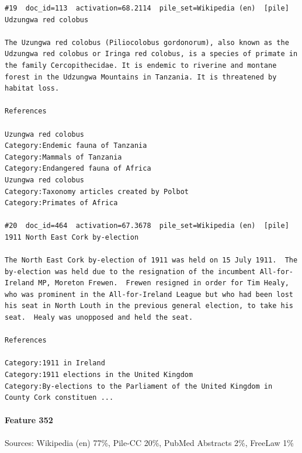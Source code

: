 \begin{verbatim}
#19  doc_id=113  activation=68.2114  pile_set=Wikipedia (en)  [pile]
Udzungwa red colobus

The Uzungwa red colobus (Piliocolobus gordonorum), also known as the Udzungwa red colobus or Iringa red colobus, is a species of primate in the family Cercopithecidae. It is endemic to riverine and montane forest in the Udzungwa Mountains in Tanzania. It is threatened by habitat loss.

References

Uzungwa red colobus
Category:Endemic fauna of Tanzania
Category:Mammals of Tanzania
Category:Endangered fauna of Africa
Uzungwa red colobus
Category:Taxonomy articles created by Polbot
Category:Primates of Africa

#20  doc_id=464  activation=67.3678  pile_set=Wikipedia (en)  [pile]
1911 North East Cork by-election

The North East Cork by-election of 1911 was held on 15 July 1911.  The by-election was held due to the resignation of the incumbent All-for-Ireland MP, Moreton Frewen.  Frewen resigned in order for Tim Healy, who was prominent in the All-for-Ireland League but who had been lost his seat in North Louth in the previous general election, to take his seat.  Healy was unopposed and held the seat.

References

Category:1911 in Ireland
Category:1911 elections in the United Kingdom
Category:By-elections to the Parliament of the United Kingdom in County Cork constituen ...

\end{verbatim}

\paragraph*{Feature 352} Sources: Wikipedia (en) 77\%, Pile-CC 20\%, PubMed Abstracts 2\%, FreeLaw 1\%

